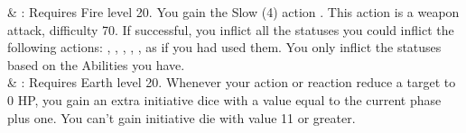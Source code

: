\begin{tabjob}
     & %
    : Requires Fire level 20. You gain the Slow (4) action . This action is a weapon attack, difficulty 70. If successful, you inflict all the statuses you could inflict the following actions: , , , , , as if you had used them. You only inflict the statuses based on the Abilities you have. \\
     & %
    : Requires Earth level 20. Whenever your action or reaction reduce a target to 0 HP, you gain an extra initiative dice with a value equal to the current phase plus one. You can’t gain initiative die with value 11 or greater. \\
\end{tabjob}